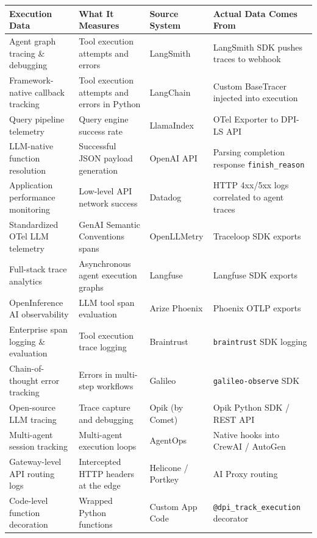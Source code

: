 \documentclass[11pt,a4paper]{article}
\begin{document}
\begin{table}[htbp]
\centering
\renewcommand{\arraystretch}{1.4}
\small
{}
\begin{tabularx}{\textwidth}{| >{\raggedright\arraybackslash}X >{\raggedright\arraybackslash}X >{\raggedright\arraybackslash}p{3cm} >{\raggedright\arraybackslash}X |}
\hline
\rowcolor{dpicloud!30} \textbf{Execution Data} & \textbf{What It Measures} & \textbf{Source System} & \textbf{Actual Data Comes From} \\
\hline
Agent graph tracing \& debugging & Tool execution attempts and errors & LangSmith & LangSmith SDK pushes traces to webhook \\
Framework-native callback tracking & Tool execution attempts and errors in Python & LangChain & Custom BaseTracer injected into execution \\
Query pipeline telemetry & Query engine success rate & LlamaIndex & OTel Exporter to DPI-LS API \\
LLM-native function resolution & Successful JSON payload generation & OpenAI API & Parsing completion response \texttt{finish\_reason} \\
Application performance monitoring & Low-level API network success & Datadog & HTTP 4xx/5xx logs correlated to agent traces \\
Standardized OTel LLM telemetry & GenAI Semantic Conventions spans & OpenLLMetry & Traceloop SDK exports \\
Full-stack trace analytics & Asynchronous agent execution graphs & Langfuse & Langfuse SDK exports \\
OpenInference AI observability & LLM tool span evaluation & Arize Phoenix & Phoenix OTLP exports \\
Enterprise span logging \& evaluation & Tool execution trace logging & Braintrust & \texttt{braintrust} SDK logging \\
Chain-of-thought error tracking & Errors in multi-step workflows & Galileo & \texttt{galileo-observe} SDK \\
Open-source LLM tracing & Trace capture and debugging & Opik (by Comet) & Opik Python SDK / REST API \\
Multi-agent session tracking & Multi-agent execution loops & AgentOps & Native hooks into CrewAI / AutoGen \\
Gateway-level API routing logs & Intercepted HTTP headers at the edge & Helicone / Portkey & AI Proxy routing \\
Code-level function decoration & Wrapped Python functions & Custom App Code & \texttt{@dpi\_track\_execution} decorator \\
\hline
\end{tabularx}
\end{table}
\end{document}
